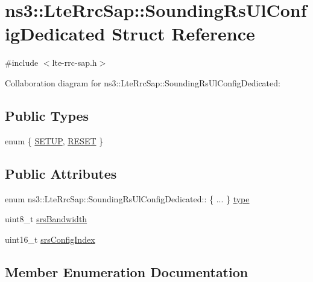 \hypertarget{structns3_1_1LteRrcSap_1_1SoundingRsUlConfigDedicated}{}\section{ns3\+:\+:Lte\+Rrc\+Sap\+:\+:Sounding\+Rs\+Ul\+Config\+Dedicated Struct Reference}
\label{structns3_1_1LteRrcSap_1_1SoundingRsUlConfigDedicated}


{\ttfamily \#include $<$lte-\/rrc-\/sap.\+h$>$}



Collaboration diagram for ns3\+:\+:Lte\+Rrc\+Sap\+:\+:Sounding\+Rs\+Ul\+Config\+Dedicated\+:
\subsection*{Public Types}
\begin{DoxyCompactItemize}
\item 
enum \{ \hyperlink{structns3_1_1LteRrcSap_1_1SoundingRsUlConfigDedicated_a79c5b04ec873cbf1a52b7e0d9b76a5a7a457376b675eb174369652c323f5f9a36}{S\+E\+T\+UP}, 
\hyperlink{structns3_1_1LteRrcSap_1_1SoundingRsUlConfigDedicated_a79c5b04ec873cbf1a52b7e0d9b76a5a7acf6c9469b179db793d38b6d3e78516f5}{R\+E\+S\+ET}
 \}
\end{DoxyCompactItemize}
\subsection*{Public Attributes}
\begin{DoxyCompactItemize}
\item 
enum ns3\+::\+Lte\+Rrc\+Sap\+::\+Sounding\+Rs\+Ul\+Config\+Dedicated\+:: \{ ... \}  \hyperlink{structns3_1_1LteRrcSap_1_1SoundingRsUlConfigDedicated_a81aaa2d0e8fb89ca62ead94f96be175b}{type}
\item 
uint8\+\_\+t \hyperlink{structns3_1_1LteRrcSap_1_1SoundingRsUlConfigDedicated_a6623b04421ee665595dd906ee2398648}{srs\+Bandwidth}
\item 
uint16\+\_\+t \hyperlink{structns3_1_1LteRrcSap_1_1SoundingRsUlConfigDedicated_a2cbee1ba9dd47b4b690a8d0e91d209be}{srs\+Config\+Index}
\end{DoxyCompactItemize}


\subsection{Member Enumeration Documentation}
